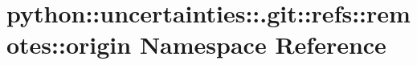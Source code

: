 \hypertarget{namespacepython_1_1uncertainties_1_1_8git_1_1refs_1_1remotes_1_1origin}{
\section{python::uncertainties::.git::refs::remotes::origin Namespace Reference}
\label{namespacepython_1_1uncertainties_1_1_8git_1_1refs_1_1remotes_1_1origin}
}
